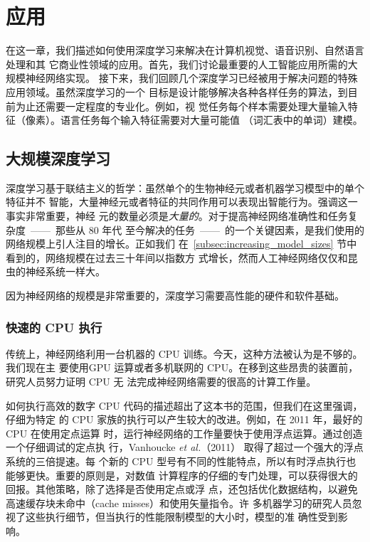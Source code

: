 \chapter{应用}
\label{ch:applications}

在这一章，我们描述如何使用深度学习来解决在计算机视觉、语音识别、自然语言处理和其
它商业性领域的应用。首先，我们讨论最重要的人工智能应用所需的大规模神经网络实现。
接下来，我们回顾几个深度学习已经被用于解决问题的特殊应用领域。虽然深度学习的一个
目标是设计能够解决各种各样任务的算法，到目前为止还需要一定程度的专业化。例如，视
觉任务每个样本需要处理大量输入特征（像素）。语言任务每个输入特征需要对大量可能值
（词汇表中的单词）建模。

\section{大规模深度学习}
\label{sec:large_scale_deep_learning}

深度学习基于联结主义的哲学：虽然单个的生物神经元或者机器学习模型中的单个特征并不
智能，大量神经元或者特征的共同作用可以表现出智能行为。强调这一事实非常重要，神经
元的数量必须是\emph{大量的}。对于提高神经网络准确性和任务复杂度~——~那些从 80 年代
至今解决的任务~——~的一个关键因素，是我们使用的网络规模上引人注目的增长。正如我们
在~\ref{subsec:increasing_model_sizes} 节中看到的，网络规模在过去三十年间以指数方
式增长，然而人工神经网络仅仅和昆虫的神经系统一样大。

因为神经网络的规模是非常重要的，深度学习需要高性能的硬件和软件基础。

\subsection{快速的 CPU 执行}
\label{subsec:fast_cpu_implementations}

传统上，神经网络利用一台机器的 CPU 训练。今天，这种方法被认为是不够的。我们现在主
要使用GPU 运算或者多机联网的 CPU。在移到这些昂贵的装置前，研究人员努力证明 CPU 无
法完成神经网络需要的很高的计算工作量。

如何执行高效的数字 CPU 代码的描述超出了这本书的范围，但我们在这里强调，仔细为特定
的 CPU 家族的执行可以产生较大的改进。例如，在 2011 年，最好的 CPU 在使用定点运算
时，运行神经网络的工作量要快于使用浮点运算。通过创造一个仔细调试的定点执
行，Vanhoucke \textit{et al.}（2011） 取得了超过一个强大的浮点系统的三倍提速。每
个新的 CPU 型号有不同的性能特点，所以有时浮点执行也能够更快。重要的原则是，对数值
计算程序的仔细的专门处理，可以获得很大的回报。其他策略，除了选择是否使用定点或浮
点，还包括优化数据结构，以避免高速缓存块未命中（cache misses）和使用矢量指令。许
多机器学习的研究人员忽视了这些执行细节，但当执行的性能限制模型的大小时，模型的准
确性受到影响。

